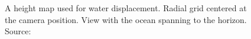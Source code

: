 \begin{figure}
{	\label{fig:kryachko:meshing}
 }
 \hfill
 \caption{
   A height map used for water displacement.
   Radial grid centered at the camera position.
   View with the ocean spanning to the horizon.
  Source:~\cite{Kryachko:2005}
}
\label{fig:kryachko}
\end{figure}
%

